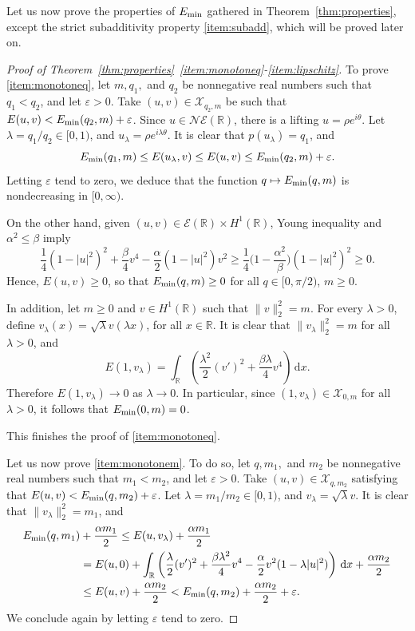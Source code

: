 \documentclass[11pt]{article}
\newcommand{\R}{\mathbb{R}}
\newcommand{\boE}{\mathcal{E}}
\newcommand{\boX}{\mathcal{X}}
\newcommand{\NE}{\mathcal{NE}(\mathbb{R})}
\newcommand{\Emin}{E_\textup{min}}
\renewcommand{\d}{\,\mathrm{d}}
\theoremstyle{plain}
\theoremstyle{definition}
\theoremstyle{remark}
\numberwithin{equation}{section}
\begin{document}
{Let us now prove the properties of $\Emin$ gathered in Theorem~\ref{thm:properties}, except the strict subadditivity property \ref{item:subadd}, which will be proved later on.

\begin{proof}[Proof of Theorem~\ref{thm:properties}~\ref{item:monotoneq}-\ref{item:lipschitz}]
	To prove \ref{item:monotoneq}, let $m, q_1,$ and $q_2$ be nonnegative real numbers such that $q_1<q_2$, and let $\varepsilon>0$. Take $(u,v)\in\boX_{q_2,m}$ be such that $E(u,v)<\Emin(q_2,m)+\varepsilon$. Since $u\in\NE$, there is a lifting $u=\rho e^{i\theta}$.  Let $\lambda=q_1/q_2\in [0,1)$, and $u_\lambda=\rho e^{i\lambda\theta}$. It is clear that $p(u_\lambda)=q_1$, and
\[\Emin(q_1,m)\leq E(u_\lambda,v)\leq E(u,v)\leq\Emin(q_2,m)+\varepsilon.\]
Letting $\varepsilon$ tend to zero, we deduce that the function $q\mapsto \Emin(q,m)$ is nondecreasing in $[0,\infty)$. 

{On the other hand, given $(u,v)\in\boE(\R)\times H^1(\R)$, Young inequality and $\alpha^2\leq\beta$ imply
\begin{equation*}
\frac14(1-|u|^2)^2 + \frac{\beta}{4}v^4 -\frac{\alpha}{2}(1-|u|^2) v^2 \geq \frac14\Big(1-\frac{\alpha^2}{\beta}\Big)(1-|u|^2)^2 \geq 0.
\end{equation*}
Hence, $E(u,v)\geq 0$, so that $\Emin(q,m)\geq 0$ for all $q\in [0,\pi/2)$, $m\geq 0$. 

In addition, let $m\geq 0$ and $v\in H^1(\R)$ such that $\|v\|_2^2=m$. For every $\lambda>0$, define $v_\lambda(x)=\sqrt{\lambda}v(\lambda x)$, for all $x\in\R$. It is clear that $\|v_\lambda\|_2^2=m$ for all $\lambda>0$, and
\[E(1,v_\lambda)=\int_\R\left(\frac{\lambda^2}{2}(v')^2+\frac{\beta\lambda}{4}v^4\right)\d x.\]
Therefore $E(1,v_\lambda)\to 0$ as $\lambda\to 0$. In particular, since $(1,v_\lambda)\in\boX_{0,m}$ for all $\lambda>0$, it follows that $\Emin(0,m)=0$.} This finishes the proof of \ref{item:monotoneq}. 

Let us now prove \ref{item:monotonem}. To do so,  let $q, m_1,$ and $m_2$ be nonnegative real numbers such that $m_1<m_2$, and let $\varepsilon>0$. Take $(u,v)\in\boX_{q,m_2}$ satisfying that $E(u,v)<\Emin(q,m_2)+\varepsilon$. Let $\lambda=m_1/m_2\in [0,1)$, and $v_\lambda=\sqrt{\lambda}v$. It is clear that $\|v_\lambda\|^2_2=m_1$, and
\begin{align*}
	\Emin(q,m_1)&+\frac{\alpha m_1}{2}\leq E(u,v_\lambda)+\frac{\alpha m_1}{2}
\\ 
&=E(u,0)+\int_\R\left(\frac{\lambda}{2}(v')^2+\frac{\beta\lambda^2}{4}v^4-\frac{\alpha}{2}v^2(1-\lambda|u|^2)\right)\d x +\frac{\alpha m_2}{2}
\\
&\leq E(u,v)+\frac{\alpha m_2}{2}<\Emin(q,m_2)+\frac{\alpha m_2}{2}+\varepsilon.
\end{align*}
We conclude again by letting $\varepsilon$ tend to zero.



\end{proof}}
\end{document}
